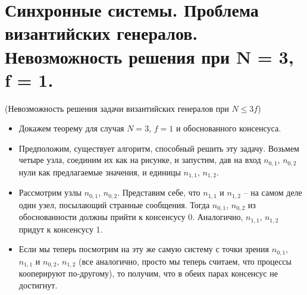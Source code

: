 \section{Синхронные системы. Проблема византийских генералов. Невозможность решения при N = 3, f = 1.}


\begin{theorem} (Невозможность решения задачи византийских генералов при $N \leqslant 3f$)
    \begin{itemize}
        \item Докажем теорему для случая $N = 3$, $f = 1$ и обоснованного консенсуса.
        \item Предположим, существует алгоритм, способный решить эту задачу. Возьмем
            четыре узла, соединим их как на рисунке, и запустим, дав на вход
            $n_{0, 1}$, $n_{0, 2}$ нули как предлагаемые значения, и
            единицы $n_{1, 1}$, $n_{1, 2}$.
        \item Рассмотрим узлы $n_{0, 1}$, $n_{0, 2}$. Представим себе, что $n_{1, 1}$
            и $n_{1, 2}$ -- на самом деле один узел, посылающий странные сообщения.
            Тогда $n_{0, 1}$, $n_{0, 2}$ из обоснованности должны прийти к консенсусу 0.
            Аналогично, $n_{1, 1}$, $n_{1, 2}$ придут к консенсусу 1.
        \item Если мы теперь посмотрим на эту же самую систему с точки зрения
            $n_{0, 1}$, $n_{1, 1}$ и $n_{0, 2}$, $n_{1, 2}$ (все аналогично, просто
            мы теперь считаем, что процессы кооперируют по-другому), то получим,
            что в обеих парах консенсус не достигнут.
    \end{itemize}
\end{theorem}

